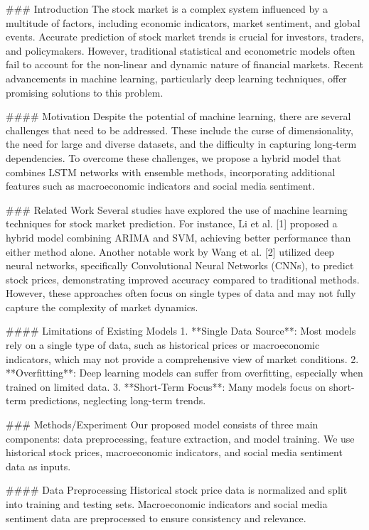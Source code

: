 ### Introduction
The stock market is a complex system influenced by a multitude of factors, including economic indicators, market sentiment, and global events. Accurate prediction of stock market trends is crucial for investors, traders, and policymakers. However, traditional statistical and econometric models often fail to account for the non-linear and dynamic nature of financial markets. Recent advancements in machine learning, particularly deep learning techniques, offer promising solutions to this problem.

#### Motivation
Despite the potential of machine learning, there are several challenges that need to be addressed. These include the curse of dimensionality, the need for large and diverse datasets, and the difficulty in capturing long-term dependencies. To overcome these challenges, we propose a hybrid model that combines LSTM networks with ensemble methods, incorporating additional features such as macroeconomic indicators and social media sentiment.

### Related Work
Several studies have explored the use of machine learning techniques for stock market prediction. For instance, Li et al. [1] proposed a hybrid model combining ARIMA and SVM, achieving better performance than either method alone. Another notable work by Wang et al. [2] utilized deep neural networks, specifically Convolutional Neural Networks (CNNs), to predict stock prices, demonstrating improved accuracy compared to traditional methods. However, these approaches often focus on single types of data and may not fully capture the complexity of market dynamics.

#### Limitations of Existing Models
1. **Single Data Source**: Most models rely on a single type of data, such as historical prices or macroeconomic indicators, which may not provide a comprehensive view of market conditions.
2. **Overfitting**: Deep learning models can suffer from overfitting, especially when trained on limited data.
3. **Short-Term Focus**: Many models focus on short-term predictions, neglecting long-term trends.

### Methods/Experiment
Our proposed model consists of three main components: data preprocessing, feature extraction, and model training. We use historical stock prices, macroeconomic indicators, and social media sentiment data as inputs.

#### Data Preprocessing
Historical stock price data is normalized and split into training and testing sets. Macroeconomic indicators and social media sentiment data are preprocessed to ensure consistency and relevance.

